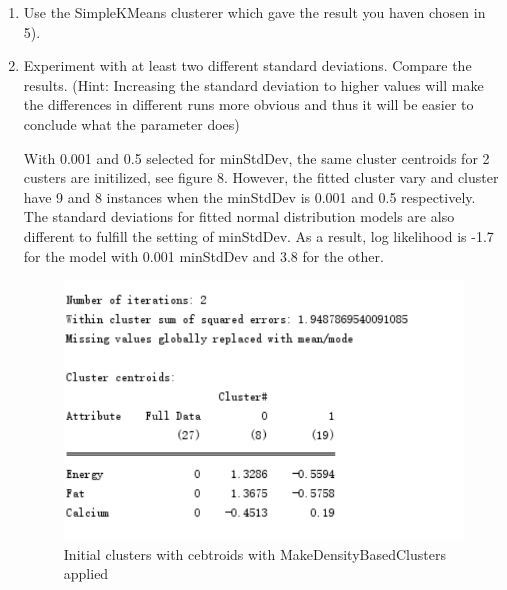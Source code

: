 \documentclass[
]{article}
\begin{document}
\begin{enumerate}
\def\labelenumi{\arabic{enumi})}
\item
  Use the SimpleKMeans clusterer which gave the result you haven chosen
  in 5).
\item
  Experiment with at least two different standard deviations. Compare
  the results. (Hint: Increasing the standard deviation to higher values
  will make the differences in different runs more obvious and thus it
  will be easier to conclude what the parameter does)

  With 0.001 and 0.5 selected for minStdDev, the same cluster centroids
  for 2 custers are initilized, see figure 8. However, the fitted
  cluster vary and cluster have 9 and 8 instances when the minStdDev is
  0.001 and 0.5 respectively. The standard deviations for fitted normal
  distribution models are also different to fulfill the setting of
  minStdDev. As a result, log likelihood is -1.7 for the model with
  0.001 minStdDev and 3.8 for the other.

  \begin{figure}
  \centering
  \includegraphics[width=6.25in,height=\textheight]{Pictures/8.png}
  \caption{Initial clusters with cebtroids with MakeDensityBasedClusters
  applied}
  \end{figure}
\end{enumerate}
\end{document}
